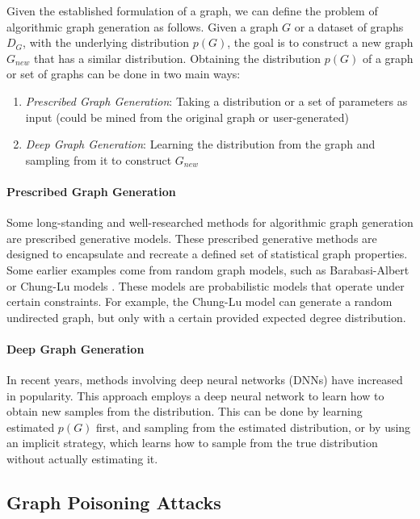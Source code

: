 \documentclass{article}
\begin{document}
Given the established formulation of a graph, we can define the problem of algorithmic graph generation as follows. Given a graph $G$ or a dataset of graphs $D_G$, with the underlying distribution $p(G)$, the goal is to construct a new graph $G_{new}$ that has a similar distribution. Obtaining the distribution $p(G)$ of a graph or set of graphs can be done in two main ways: \begin{enumerate}
  \setlength\itemsep{0.1em}
  \item \emph{Prescribed Graph Generation}: Taking a distribution or a set of parameters as input (could be mined from the original graph or user-generated)
  \item \emph{Deep Graph Generation}: Learning the distribution from the graph and sampling from it to construct $G_{new}$
\end{enumerate}

\paragraph{Prescribed Graph Generation} 

Some long-standing and well-researched methods for algorithmic graph generation are prescribed generative models. These prescribed generative methods are designed to encapsulate and recreate a defined set of statistical graph properties. Some earlier examples come from random graph models, such as Barabasi-Albert \cite{barabasi-albert} or Chung-Lu models \cite{chunglu}. These models are probabilistic models that operate under certain constraints. For example, the Chung-Lu model can generate a random undirected graph, but only with a certain provided expected degree distribution. 

\paragraph{Deep Graph Generation}

In recent years, methods involving deep neural networks (DNNs) have increased in popularity. This approach employs a deep neural network to learn how to obtain new samples from the distribution. This can be done by learning  estimated $p(G)$ first, and sampling from the estimated distribution, or by using an implicit strategy, which learns how to sample from the true distribution without actually estimating it. 

\subsection{Graph Poisoning Attacks}
\end{document}
